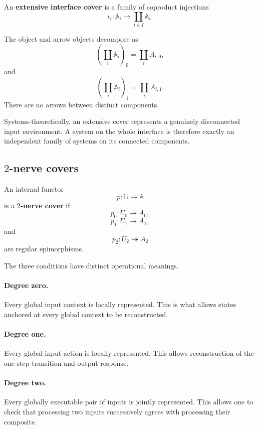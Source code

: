 \begin{definition}
\label{def:extensive-interface-cover}
An \textbf{extensive interface cover} is a family of coproduct injections
\[
    \iota_i:
    \mathbb A_i\to
    \coprod_{i\in I}\mathbb A_i.
\]
\end{definition}

The object and arrow objects decompose as
\[
    \left(
        \coprod_i\mathbb A_i
    \right)_0
    =
    \coprod_iA_{i,0},
\]
and
\[
    \left(
        \coprod_i\mathbb A_i
    \right)_1
    =
    \coprod_iA_{i,1}.
\]
There are no arrows between distinct components.

Systems-theoretically, an extensive cover represents a genuinely disconnected
input environment. A system on the whole interface is therefore exactly an
independent family of systems on its connected components.

\subsection{\texorpdfstring{\(2\)}{2}-nerve covers}
\label{subsec:two-nerve-covers}

\begin{definition}
\label{def:two-nerve-cover}
An internal functor
\[
    p:\mathbb U\to\mathbb A
\]
is a \textbf{\(2\)-nerve cover} if
\[
    p_0:U_0\twoheadrightarrow A_0,
\]
\[
    p_1:U_1\twoheadrightarrow A_1,
\]
and
\[
    p_2:U_2\twoheadrightarrow A_2
\]
are regular epimorphisms.
\end{definition}

The three conditions have distinct operational meanings.

\paragraph{Degree zero.}
Every global input context is locally represented. This is what allows states
anchored at every global context to be reconstructed.

\paragraph{Degree one.}
Every global input action is locally represented. This allows reconstruction
of the one-step transition and output response.

\paragraph{Degree two.}
Every globally executable pair of inputs is jointly represented. This allows
one to check that processing two inputs successively agrees with processing
their composite.

